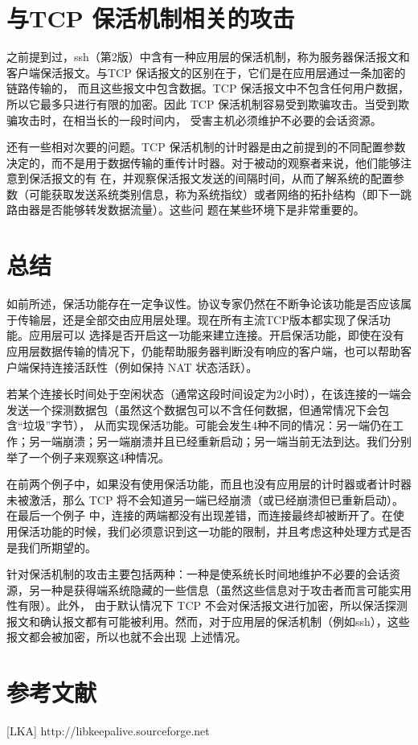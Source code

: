 \section{与TCP 保活机制相关的攻击}
之前提到过，ssh（第2版）中含有一种应用层的保活机制，称为服务器保活报文和客户端保活报文。与TCP 保话报文的区别在于，它们是在应用层通过一条加密的链路传输的，
而且这些报文中包含数据。TCP 保活报文中不包含任何用户数据，所以它最多只进行有限的加密。因此 TCP 保活机制容易受到欺骗攻击。当受到欺骗攻击时，在相当长的一段时间内，
受害主机必须维护不必要的会话资源。

还有一些相对次要的问题。TCP 保活机制的计时器是由之前提到的不同配置参数决定的，而不是用于数据传输的重传计时器。对于被动的观察者来说，他们能够注意到保活报文的有
在，并观察保活报文发送的间隔时间，从而了解系统的配置参数（可能获取发送系统类别信息，称为系统指纹）或者网络的拓扑结构（即下一跳路由器是否能够转发数据流量）。这些问
题在某些环境下是非常重要的。

\section{总结}
如前所述，保活功能存在一定争议性。协议专家仍然在不断争论该功能是否应该属于传输层，还是全部交由应用层处理。现在所有主流TCP版本都实现了保活功能。应用层可以
选择是否开启这一功能来建立连接。开启保活功能，即使在没有应用层数据传输的情况下，仍能帮助服务器判断没有响应的客户端，也可以帮助客户端保持连接活跃性（例如保持 NAT
状态活跃）。

若某个连接长时间处于空闲状态（通常这段时间设定为2小时），在该连接的一端会发送一个探测数据包（虽然这个数据包可以不含任何数据，但通常情况下会包含“垃圾”字节），
从而实现保活功能。可能会发生4种不同的情况：另一端仍在工作；另一端崩溃；另一端崩溃并且已经重新启动；另一端当前无法到达。我们分别举了一个例子来观察这4种情况。

在前两个例子中，如果没有使用保活功能，而且也没有应用层的计时器或者计时器未被激活，那么 TCP 将不会知道另一端已经崩溃（或已经崩溃但已重新启动）。在最后一个例子
中，连接的两端都没有出现差错，而连接最终却被断开了。在使用保活功能的时候，我们必须意识到这一功能的限制，并且考虑这种处理方式是否是我们所期望的。

针对保活机制的攻击主要包括两种：一种是使系统长时间地维护不必要的会话资源，另一种是获得端系统隐藏的一些信息（虽然这些信息对于攻击者而言可能实用性有限）。此外，
由于默认情况下 TCP 不会对保活报文进行加密，所以保活探测报文和确认报文都有可能被利用。然而，对于应用层的保活机制（例如ssh），这些报文都会被加密，所以也就不会出现
上述情况。

\section{参考文献}
[LKA] http://libkeepalive.sourceforge.net
